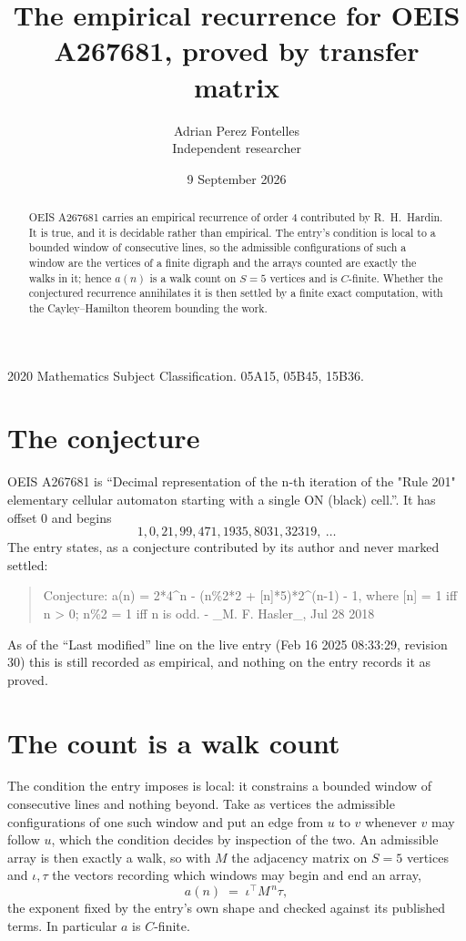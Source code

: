 \documentclass[11pt,a4paper]{article}
\title{The empirical recurrence for OEIS A267681, proved by transfer matrix}
\author{Adrian Perez Fontelles\\ \small Independent researcher}
\date{9 September 2026}
\theoremstyle{plain}
\theoremstyle{definition}
\begin{document}
\maketitle

\begin{abstract}
OEIS A267681 carries an empirical recurrence of order $4$ contributed by R.~H.~Hardin. It is
true, and it is decidable rather than empirical. The entry's condition is local to a bounded window of consecutive lines, so
the admissible configurations of such a window are the vertices of a finite digraph and the
arrays counted are exactly the walks in it; hence $a(n)$ is a walk count on $S=5$ vertices
and is $C$-finite. Whether the conjectured recurrence annihilates it is then settled by a
finite exact computation, with the Cayley--Hamilton theorem bounding the work.
\end{abstract}

\noindent\small 2020 Mathematics Subject Classification. 05A15, 05B45, 15B36.\normalsize

\section{The conjecture}

OEIS A267681 is ``Decimal representation of the n-th iteration of the "Rule 201" elementary cellular automaton starting with a single ON (black) cell.''. It has offset $0$ and begins
\[
1, 0, 21, 99, 471, 1935, 8031, 32319,\ \dots
\]
The entry states, as a conjecture contributed by its author and never marked settled:
\begin{quote}
Conjecture: a(n) = 2*4\^{}n - (n\%2*2 + [n]*5)*2\^{}(n-1) - 1, where [n] = 1 iff n > 0; n\%2 = 1 iff n is odd. - \_M. F. Hasler\_, Jul 28 2018
\end{quote}
As of the ``Last modified'' line on the live entry (Feb 16 2025 08:33:29, revision 30) this is still
recorded as empirical, and nothing on the entry records it as proved.

\section{The count is a walk count}

The condition the entry imposes is local: it constrains a bounded window of consecutive lines and nothing beyond. Take as
vertices the admissible configurations of one such window and put an edge from $u$ to $v$
whenever $v$ may follow $u$, which the condition decides by inspection of the two. An
admissible array is then exactly a walk, so with $M$ the adjacency matrix on $S=5$ vertices
and $\iota,\tau$ the vectors recording which windows may begin and end an array,
\[
a(n)\;=\;\iota^{\!\top}M^{\,n}\tau ,
\]
the exponent fixed by the entry's own shape and checked against its published terms. In
particular $a$ is $C$-finite.
\end{document}
